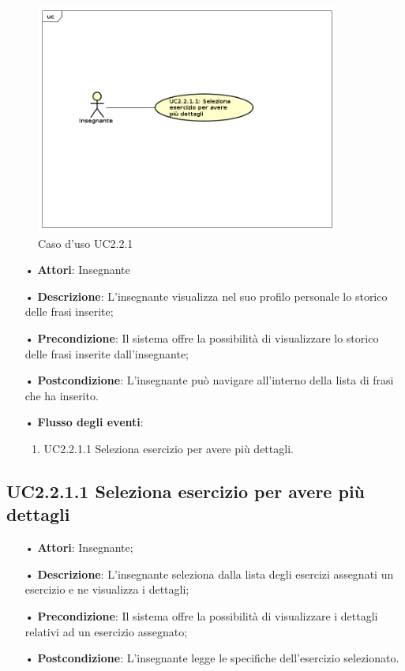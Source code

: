 \begin{figure}[H]
\centering
\includegraphics[width=10cm]{img/UC221.png} 
\caption{Caso d'uso UC2.2.1}
\end{figure}

\begin{itemize}
	\item[•] \textbf{Attori}:  Insegnante	\item[•] \textbf{Descrizione}: L’insegnante visualizza nel suo profilo personale lo storico delle frasi inserite; 
	\item[•] \textbf{Precondizione}: Il sistema offre la possibilità di visualizzare lo storico delle frasi inserite dall’insegnante;
	\item[•] \textbf{Postcondizione}:  L’insegnante può navigare all’interno della lista di frasi che ha inserito.
	\item[•] \textbf{Flusso degli eventi}:
		\begin{enumerate}
			\item UC2.2.1.1  Seleziona esercizio per avere più dettagli.
		\end{enumerate}
\end{itemize}

\subsection{UC2.2.1.1 Seleziona esercizio per avere più dettagli}
\begin{itemize}
	\item[•] \textbf{Attori}: Insegnante;
	\item[•] \textbf{Descrizione}:  L’insegnante seleziona dalla lista degli esercizi assegnati un esercizio e ne visualizza i dettagli;
	\item[•] \textbf{Precondizione}: Il sistema offre la possibilità di visualizzare i dettagli relativi ad un esercizio assegnato;
	\item[•] \textbf{Postcondizione}: L’insegnante legge le specifiche dell’esercizio selezionato.
\end{itemize}

